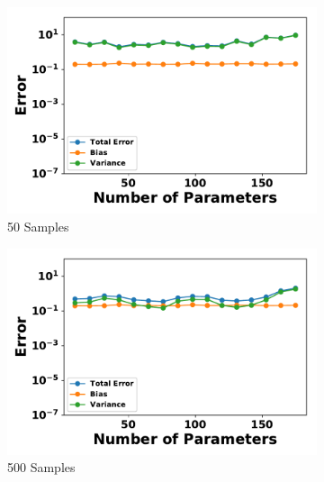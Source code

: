 \documentclass[letterpaper]{article} %
\begin{document}
        \begin{figure}[p]
          \centering
          \begin{subfigure}[b]{0.245\textwidth}
              \centering
              \includegraphics[width=\textwidth]{./RBM_Error_vs_HiddenNodes_Samples50-eps-converted-to.pdf}
              \caption{50 Samples}
          \end{subfigure}
          \begin{subfigure}[b]{0.245\textwidth}
              \centering
              \includegraphics[width=\textwidth]{./RBM_Error_vs_HiddenNodes_Samples500-eps-converted-to.pdf}
              \caption{500 Samples}
          \end{subfigure}
          \begin{subfigure}[b]{0.245\textwidth}
              \centering

\end{subfigure}
\end{figure}
\end{document}
